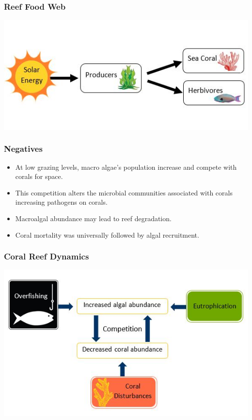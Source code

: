 \documentclass{beamer}
\begin{document}
\begin{frame}
\frametitle{Reef Food Web}
\includegraphics[scale=.8]{./CoralfoodWeb}
\end{frame}

\begin{frame}
\frametitle{Negatives}
\begin{itemize}
\item At low grazing levels, macro algae’s population increase and compete with corals for space.
\item This competition alters the microbial communities associated with corals increasing pathogens on corals.
\item Macroalgal abundance may lead to reef degradation.
\item Coral mortality was universally followed by algal recruitment.
\end{itemize}
\end{frame}

\begin{frame}
\frametitle{Coral Reef Dynamics}
\includegraphics[scale=.7]{./CoralDynamics}
\end{frame}
\end{document}
